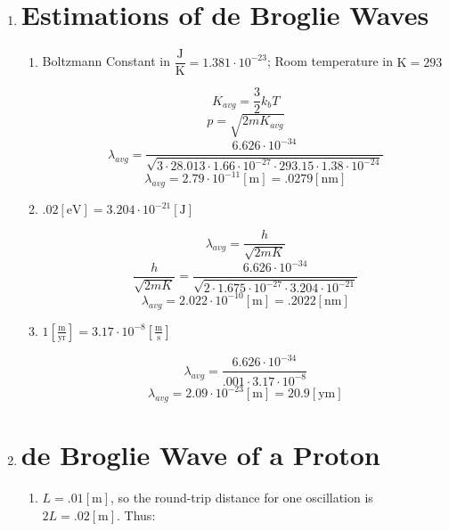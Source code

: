 \begin{enumerate}

  \item 
    
    \section*{Estimations of de Broglie Waves}

    \begin{enumerate}

      \item Boltzmann Constant in $\dfrac{\si{\joule}}{\si{\kelvin}}=1.381\cdot10^{-23}$; Room temperature in $\si{\kelvin}=293$

        $$K_{avg}=\frac{3}{2}k_bT$$
        $$p=\sqrt{2mK_{avg}}$$
        $$\lambda_{avg}=\frac{6.626\cdot10^{-34}}{\sqrt{3\cdot28.013\cdot1.66\cdot10^{-27}\cdot293.15\cdot1.38\cdot10^{-24}}}$$
        $$\boxed{\lambda_{avg}=2.79\cdot10^{-11}[\si{\meter}]=.0279[\si{\nano\meter}]}$$

      \item $.02[\si{\eV}]=3.204\cdot10^{-21}[\si{\joule}]$

        $$\lambda_{avg}=\frac{h}{\sqrt{2mK}}$$
        $$\frac{h}{\sqrt{2mK}}=\frac{6.626\cdot10^{-34}}{\sqrt{2\cdot1.675\cdot10^{-27}\cdot3.204\cdot10^{-21}}}$$
        $$\boxed{\lambda_{avg}=2.022\cdot10^{-10}[\si{\meter}]=.2022[\si{\nano\meter}]}$$

      \item $1\left[ \frac{\si{\meter}}{\text{yr}} \right]=3.17\cdot10^{-8}\left[ \frac{\si{\meter}}{\si{\second}} \right]$

        $$\lambda_{avg}=\frac{6.626\cdot10^{-34}}{.001\cdot3.17\cdot10^{-8}}$$
        $$\boxed{\lambda_{avg}=2.09\cdot10^{-23}[\si{\meter}]=20.9[\si{\yocto\meter}]}$$

    \end{enumerate}

  \item

    \section*{de Broglie Wave of a Proton}

    \begin{enumerate}

      \item $L=.01[\si{\meter}]$, so the round-trip distance for one oscillation is $2L=.02[\si{\meter}]$. Thus:


\end{enumerate}
\end{enumerate}
